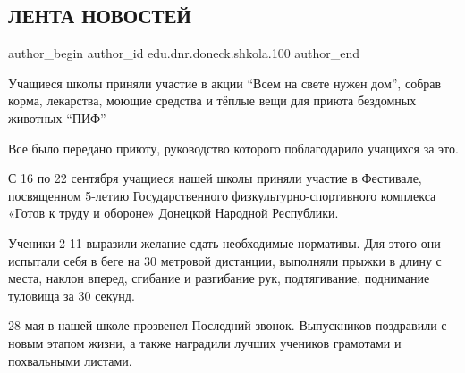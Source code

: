  
 
 
 
 
\subsection{ЛЕНТА НОВОСТЕЙ}
\label{sec:30_12_2021.edu.dnr.doneck.shkola.100.1.novosti}

\ifcmt
 author_begin
   author_id edu.dnr.doneck.shkola.100
 author_end
\fi




Учащиеся школы приняли участие в акции \enquote{Всем на свете нужен дом}, собрав корма,
лекарства, моющие средства и тёплые вещи для приюта бездомных животных \enquote{ПИФ}

Все было передано приюту, руководство которого поблагодарило  учащихся за это.


С 16 по 22 сентября учащиеся нашей школы приняли участие в Фестивале,
посвященном 5-летию Государственного физкультурно-спортивного комплекса «Готов
к труду и обороне» Донецкой Народной Республики.

Ученики 2-11 выразили желание сдать необходимые нормативы. Для этого они
испытали себя в беге на 30 метровой дистанции, выполняли прыжки в длину с
места, наклон вперед, сгибание и разгибание рук, подтягивание, поднимание
туловища за 30 секунд.



28 мая в нашей школе прозвенел Последний звонок. Выпускников поздравили с новым
этапом жизни, а также наградили лучших учеников грамотами и похвальными
листами. 

